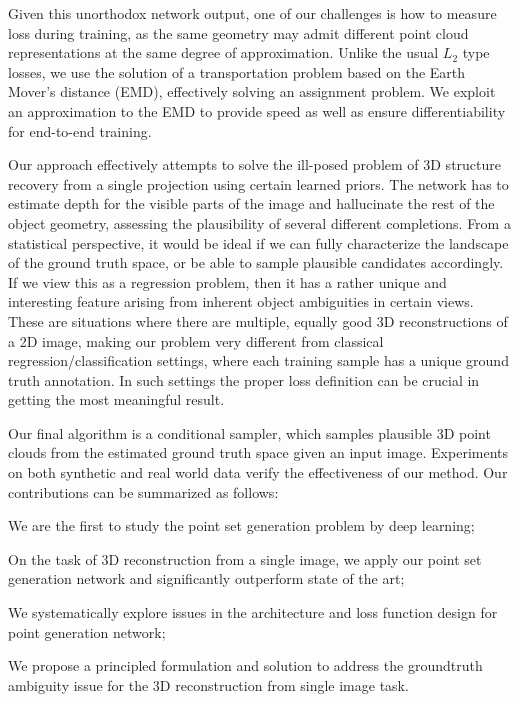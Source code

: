 Given this unorthodox network output, one of our challenges is how to measure loss during training, as the same geometry may admit different point cloud representations at the same degree of approximation. Unlike the usual $L_2$ type losses, we use the solution of a transportation problem based on the Earth Mover's distance (EMD), effectively solving an assignment problem. We exploit an approximation to the EMD to provide speed as well as ensure differentiability for end-to-end training.

Our approach effectively attempts to solve the ill-posed problem of 3D structure recovery from a single projection using certain learned priors. The network has to estimate depth for the visible parts of the image and hallucinate the rest of the object geometry, assessing the plausibility of several different completions. From a statistical perspective, it would be ideal if we can fully characterize the landscape of the ground truth space, or be able to sample plausible candidates accordingly. If we view this as a regression problem, then it has a rather unique and interesting feature arising from inherent object ambiguities in certain views. These are situations where there are multiple, equally good 3D reconstructions of a 2D image, making our problem very different from classical regression/classification settings, where each training sample has a unique ground truth annotation. In such settings the proper loss definition can be crucial in getting the most meaningful result.

Our final algorithm is a conditional sampler, which samples plausible 3D point clouds from the estimated ground truth space given an input image. Experiments on both synthetic and real world data verify the effectiveness of our method. %
Our contributions can be summarized as follows:
\bitem
  \item We are the first to study the point set generation problem by deep learning; 
  \item On the task of 3D reconstruction from a single image, we apply our point set generation network and significantly outperform state of the art;
  \item We systematically explore issues in the architecture and loss function design for point generation network;
  \item We propose a principled formulation and solution to address the groundtruth ambiguity issue for the 3D reconstruction from single image task.
\eitem

